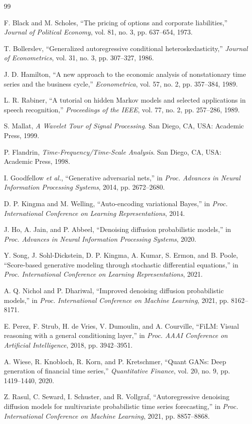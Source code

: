 \documentclass[conference]{IEEEtran}
\begin{document}
\balance
\begin{thebibliography}{99}

F. Black and M. Scholes, ``The pricing of options and corporate liabilities,'' \emph{Journal of Political Economy}, vol. 81, no. 3, pp. 637--654, 1973.

T. Bollerslev, ``Generalized autoregressive conditional heteroskedasticity,'' \emph{Journal of Econometrics}, vol. 31, no. 3, pp. 307--327, 1986.

J. D. Hamilton, ``A new approach to the economic analysis of nonstationary time series and the business cycle,'' \emph{Econometrica}, vol. 57, no. 2, pp. 357--384, 1989.

L. R. Rabiner, ``A tutorial on hidden Markov models and selected applications in speech recognition,'' \emph{Proceedings of the IEEE}, vol. 77, no. 2, pp. 257--286, 1989.

S. Mallat, \emph{A Wavelet Tour of Signal Processing}. San Diego, CA, USA: Academic Press, 1999.

P. Flandrin, \emph{Time-Frequency/Time-Scale Analysis}. San Diego, CA, USA: Academic Press, 1998.

I. Goodfellow \emph{et al.}, ``Generative adversarial nets,'' in \emph{Proc. Advances in Neural Information Processing Systems}, 2014, pp. 2672--2680.

D. P. Kingma and M. Welling, ``Auto-encoding variational Bayes,'' in \emph{Proc. International Conference on Learning Representations}, 2014.

J. Ho, A. Jain, and P. Abbeel, ``Denoising diffusion probabilistic models,'' in \emph{Proc. Advances in Neural Information Processing Systems}, 2020.

Y. Song, J. Sohl-Dickstein, D. P. Kingma, A. Kumar, S. Ermon, and B. Poole, ``Score-based generative modeling through stochastic differential equations,'' in \emph{Proc. International Conference on Learning Representations}, 2021.

A. Q. Nichol and P. Dhariwal, ``Improved denoising diffusion probabilistic models,'' in \emph{Proc. International Conference on Machine Learning}, 2021, pp. 8162--8171.

E. Perez, F. Strub, H. de Vries, V. Dumoulin, and A. Courville, ``FiLM: Visual reasoning with a general conditioning layer,'' in \emph{Proc. AAAI Conference on Artificial Intelligence}, 2018, pp. 3942--3951.

A. Wiese, R. Knobloch, R. Korn, and P. Kretschmer, ``Quant GANs: Deep generation of financial time series,'' \emph{Quantitative Finance}, vol. 20, no. 9, pp. 1419--1440, 2020.

Z. Rasul, C. Seward, I. Schuster, and R. Vollgraf, ``Autoregressive denoising diffusion models for multivariate probabilistic time series forecasting,'' in \emph{Proc. International Conference on Machine Learning}, 2021, pp. 8857--8868.

\end{thebibliography}
\end{document}

